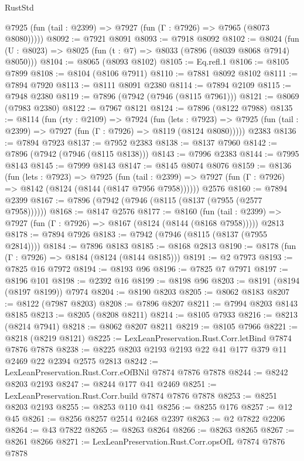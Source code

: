 \begin{lexlean}{RustStd}
\begin{coremodule}
      @7925 (fun (tail : @2399) => @7927 (fun (Γ : @7926) => @7965 (@8073 @8080)))))
@8092 := @7921 @8091
@8093 := @7918 @8092
@8102 := @8024 (fun (U : @8023) => @8025 (fun (t : @7) => @8033 (@7896 (@8039 @8068 @7914) @8050)))
@8104 := @8065 (@8093 @8102)
@8105 := Eq.refl.{1}
@8106 := @8105 @7899
@8108 := @8104 (@8106 @7911)
@8110 := @7881 @8092 @8102
@8111 := @7894 @7920
@8113 := @8111 @8091 @2380
@8114 := @7894 @2109
@8115 := @7948 @2380
@8119 := @7896 (@7942 (@7946 (@8115 @7961)))
@8121 := @8069 (@7983 @2380)
@8122 := @7967 @8121
@8124 := @7896 (@8122 @7988)
@8135 := @8114
    (fun (rty : @2109) =>
    @7924
      (fun (lets : @7923) =>
      @7925 (fun (tail : @2399) => @7927 (fun (Γ : @7926) => @8119 (@8124 @8080)))))
    @2383
@8136 := @7894 @7923
@8137 := @7952 @2383
@8138 := @8137 @7960
@8142 := @7896 (@7942 (@7946 (@8115 @8138)))
@8143 := @7996 @2383
@8144 := @7995 @8143
@8145 := @7999 @8143
@8147 := @8145 @8074 @8076
@8159 := @8136
    (fun (lets : @7923) =>
    @7925
      (fun (tail : @2399) => @7927 (fun (Γ : @7926) => @8142 (@8124 (@8144 (@8147 @7956 @7958))))))
    @2576
@8160 := @7894 @2399
@8167 := @7896 (@7942 (@7946 (@8115 (@8137 (@7955 (@2577 @7958))))))
@8168 := @8147 @2576
@8177 := @8160
    (fun (tail : @2399) => @7927 (fun (Γ : @7926) => @8167 (@8124 (@8144 (@8168 @7958)))))
    @2813
@8178 := @7894 @7926
@8183 := @7942 (@7946 (@8115 (@8137 (@7955 @2814))))
@8184 := @7896 @8183
@8185 := @8168 @2813
@8190 := @8178 (fun (Γ : @7926) => @8184 (@8124 (@8144 @8185)))
@8191 := @2 @7973
@8193 := @7825 @16 @7972
@8194 := @8193 @96
@8196 := @7825 @7 @7971
@8197 := @8196 @101
@8198 := @2392 @16
@8199 := @8198 @96
@8203 := @8191 (@8194 (@8197 @8199)) @7974
@8204 := @8190 @8203
@8205 := @8062 @8183
@8207 := @8122 (@7987 @8203)
@8208 := @7896 @8207
@8211 := @7994 @8203 @8143 @8185
@8213 := @8205 (@8208 @8211)
@8214 := @8105 @7933
@8216 := @8213 (@8214 @7941)
@8218 := @8062 @8207 @8211
@8219 := @8105 @7966
@8221 := @8218 (@8219 @8121)
@8225 := LexLeanPreservation.Rust.Corr.letBind @7874 @7876 @7878
@8238 := @8225 @8203 @2193 @2193 @22 @41 @177 @379 @11 @2469 @22 @2394 @2575 @2813
@8242 := LexLeanPreservation.Rust.Corr.eOfBNil @7874 @7876 @7878
@8244 := @8242 @8203 @2193
@8247 := @8244 @177 @41 @2469
@8251 := LexLeanPreservation.Rust.Corr.build @7874 @7876 @7878
@8253 := @8251 @8203 @2193
@8255 := @8253 @110 @41
@8256 := @8255 @176
@8257 := @12 @45
@8261 := @8256 @8257 @2514 @2468 @2397
@8263 := @2 @7822 @2206
@8264 := @43 @7822
@8265 := @8263 @8264
@8266 := @8263 @8265
@8267 := @8261 @8266
@8271 := LexLeanPreservation.Rust.Corr.opsOfL @7874 @7876 @7878

\end{coremodule}
\end{lexlean}
